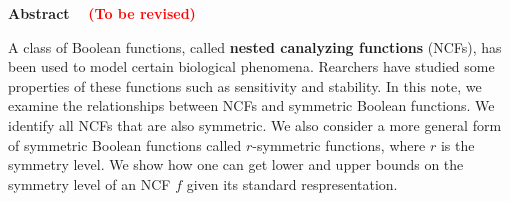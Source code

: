 \vspace*{-0.05in}
\begin{center}
\textbf{Abstract}~~ \textcolor{red}{\textbf{(To be revised)}}
\end{center}

\smallskip

A class of Boolean functions, 
called \textbf{nested canalyzing functions} (NCFs),
has been used to model certain biological phenomena.
Rearchers have studied some properties of these functions
such as sensitivity and stability.
In this note, we examine the relationships between NCFs and symmetric 
Boolean functions. 
We identify all NCFs that are also symmetric. 
We also consider a more general form of symmetric Boolean functions
called $r$-symmetric functions, where $r$ is the symmetry level.
We show how one can get lower and upper bounds on the symmetry
level of an NCF $f$ given its standard respresentation.  


